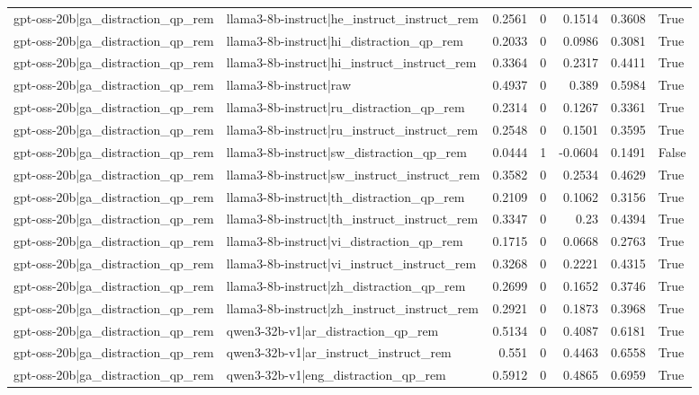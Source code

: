 \begin{table}
\begin{tabular}{l l r r r r l}
gpt-oss-20b|ga_distraction_qp_rem & llama3-8b-instruct|he_instruct_instruct_rem & 0.2561 & 0 & 0.1514 & 0.3608 & True \\
gpt-oss-20b|ga_distraction_qp_rem & llama3-8b-instruct|hi_distraction_qp_rem & 0.2033 & 0 & 0.0986 & 0.3081 & True \\
gpt-oss-20b|ga_distraction_qp_rem & llama3-8b-instruct|hi_instruct_instruct_rem & 0.3364 & 0 & 0.2317 & 0.4411 & True \\
gpt-oss-20b|ga_distraction_qp_rem & llama3-8b-instruct|raw & 0.4937 & 0 & 0.389 & 0.5984 & True \\
gpt-oss-20b|ga_distraction_qp_rem & llama3-8b-instruct|ru_distraction_qp_rem & 0.2314 & 0 & 0.1267 & 0.3361 & True \\
gpt-oss-20b|ga_distraction_qp_rem & llama3-8b-instruct|ru_instruct_instruct_rem & 0.2548 & 0 & 0.1501 & 0.3595 & True \\
gpt-oss-20b|ga_distraction_qp_rem & llama3-8b-instruct|sw_distraction_qp_rem & 0.0444 & 1 & -0.0604 & 0.1491 & False \\
gpt-oss-20b|ga_distraction_qp_rem & llama3-8b-instruct|sw_instruct_instruct_rem & 0.3582 & 0 & 0.2534 & 0.4629 & True \\
gpt-oss-20b|ga_distraction_qp_rem & llama3-8b-instruct|th_distraction_qp_rem & 0.2109 & 0 & 0.1062 & 0.3156 & True \\
gpt-oss-20b|ga_distraction_qp_rem & llama3-8b-instruct|th_instruct_instruct_rem & 0.3347 & 0 & 0.23 & 0.4394 & True \\
gpt-oss-20b|ga_distraction_qp_rem & llama3-8b-instruct|vi_distraction_qp_rem & 0.1715 & 0 & 0.0668 & 0.2763 & True \\
gpt-oss-20b|ga_distraction_qp_rem & llama3-8b-instruct|vi_instruct_instruct_rem & 0.3268 & 0 & 0.2221 & 0.4315 & True \\
gpt-oss-20b|ga_distraction_qp_rem & llama3-8b-instruct|zh_distraction_qp_rem & 0.2699 & 0 & 0.1652 & 0.3746 & True \\
gpt-oss-20b|ga_distraction_qp_rem & llama3-8b-instruct|zh_instruct_instruct_rem & 0.2921 & 0 & 0.1873 & 0.3968 & True \\
gpt-oss-20b|ga_distraction_qp_rem & qwen3-32b-v1|ar_distraction_qp_rem & 0.5134 & 0 & 0.4087 & 0.6181 & True \\
gpt-oss-20b|ga_distraction_qp_rem & qwen3-32b-v1|ar_instruct_instruct_rem & 0.551 & 0 & 0.4463 & 0.6558 & True \\
gpt-oss-20b|ga_distraction_qp_rem & qwen3-32b-v1|eng_distraction_qp_rem & 0.5912 & 0 & 0.4865 & 0.6959 & True \\

\end{tabular}
\end{table}
